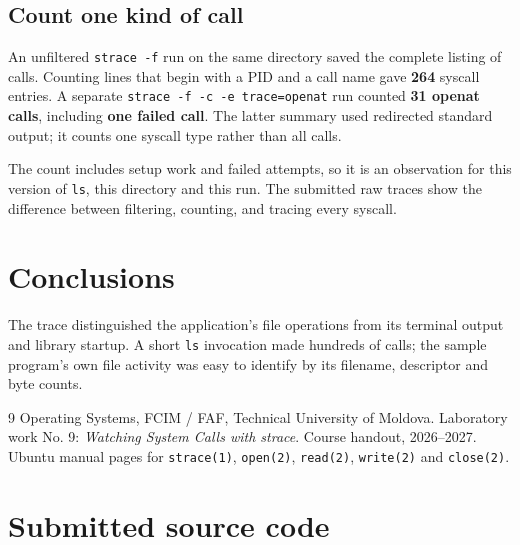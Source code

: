 \clearpage
\section{Count one kind of call}
An unfiltered \texttt{strace -f} run on the same directory saved the complete listing of calls. Counting lines that begin with a PID and a call name gave \textbf{264} syscall entries. A separate \texttt{strace -f -c -e trace=openat} run counted \textbf{31 openat calls}, including \textbf{one failed call}. The latter summary used redirected standard output; it counts one syscall type rather than all calls.


The count includes setup work and failed attempts, so it is an observation for this version of \texttt{ls}, this directory and this run. The submitted raw traces show the difference between filtering, counting, and tracing every syscall.

\par\Needspace{180pt}\vspace{0.5cm}
\chapter{Conclusions}
The trace distinguished the application's file operations from its terminal output and library startup. A short \texttt{ls} invocation made hundreds of calls; the sample program's own file activity was easy to identify by its filename, descriptor and byte counts.

\begin{thebibliography}{9}
 Operating Systems, FCIM / FAF, Technical University of Moldova. Laboratory work No. 9: \emph{Watching System Calls with strace}. Course handout, 2026--2027.
 Ubuntu manual pages for \texttt{strace(1)}, \texttt{open(2)}, \texttt{read(2)}, \texttt{write(2)} and \texttt{close(2)}.
\end{thebibliography}

\clearpage
\appendix
\chapter{Submitted source code}

